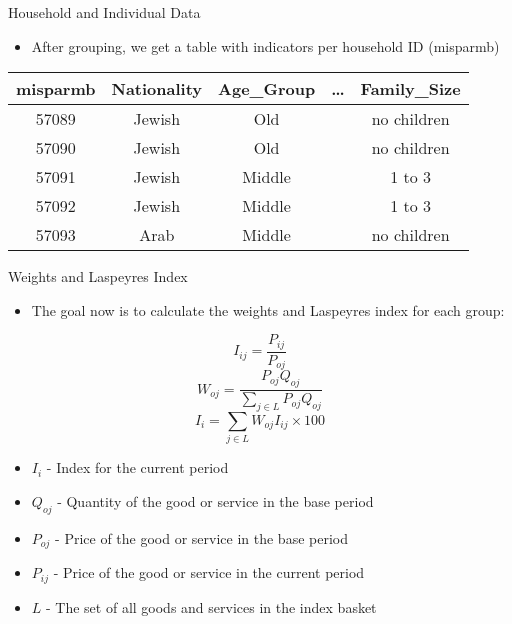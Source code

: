 \documentclass{beamer}
\begin{document}
\begin{frame}{Household and Individual Data}
    \begin{itemize}
        \item After grouping, we get a table with indicators per household ID (misparmb)
    \end{itemize}
    \begin{table}[h]
        \centering
        \begin{tabular}{c c c c c}
            \hline
            misparmb & Nationality & Age\_Group & \ldots & Family\_Size \\
            \hline
            57089    & Jewish      & Old        &        & no children  \\
            57090    & Jewish      & Old        &        & no children  \\
            57091    & Jewish      & Middle     &        & 1 to 3       \\
            57092    & Jewish      & Middle     &        & 1 to 3       \\
            57093    & Arab        & Middle     &        & no children  \\
            \hline
        \end{tabular}
        \label{tab:grouped_data}
    \end{table}
\end{frame}

\begin{frame}{Weights and Laspeyres Index}
    \begin{itemize}
        \item The goal now is to calculate the weights and Laspeyres index for each group:
    \end{itemize}
    $$
        I_{ij}=\frac{P_{ij}}{P_{oj}}
    $$
    $$
        W_{oj}=\frac{P_{oj}Q_{oj}}{\sum_{j\in L}P_{oj}Q_{oj}}
    $$
    $$
        I_{i}=\sum_{j\in L}W_{oj}I_{ij}\times 100
    $$
    \begin{itemize}
        \item $I_{i}$ - Index for the current period
        \item $Q_{oj}$ - Quantity of the good or service in the base period
        \item $P_{oj}$ - Price of the good or service in the base period
        \item $P_{ij}$ - Price of the good or service in the current period
        \item $L$ - The set of all goods and services in the index basket
    \end{itemize}
\end{frame}
\end{document}
